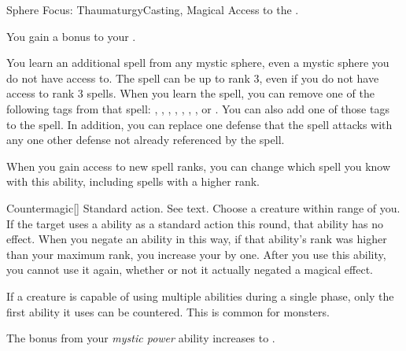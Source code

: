   \begin{magicalfeat}{Sphere Focus: Thaumaturgy}{Casting, Magical}
    \featpre Access to the  .

     You gain a  bonus to your .

     You learn an additional spell from any mystic sphere, even a mystic sphere you do not have access to.
    The spell can be up to rank 3, even if you do not have access to rank 3 spells.
    When you learn the spell, you can remove one of the following tags from that spell: \atAcid, \atAuditory, \atCold, \atCompulsion, \atEmotion, \atElectricity, \atFire, or \atVisual.
    You can also add one of those tags to the spell.
    In addition, you can replace one defense that the spell attacks with any one other defense not already referenced by the spell.

    When you gain access to new spell ranks, you can change which spell you know with this ability, including spells with a higher rank.

    \begin{magicalactiveability}{Countermagic}[]
      \abilityusagetime Standard action.
      \abilitycost See text.
      \rankline
      Choose a creature within \rngmed range of you.
      If the target uses a \magical ability as a standard action this round, that ability has no effect.
      When you negate an ability in this way, if that ability's rank was higher than your maximum rank, you increase your  by one.
      After you use this ability, you  cannot use it again, whether or not it actually negated a magical effect.

      If a creature is capable of using multiple abilities during a single phase, only the first ability it uses can be countered.
      This is common for  monsters.
    \end{magicalactiveability}

     The bonus from your \textit{mystic power} ability increases to .
  \end{magicalfeat}

